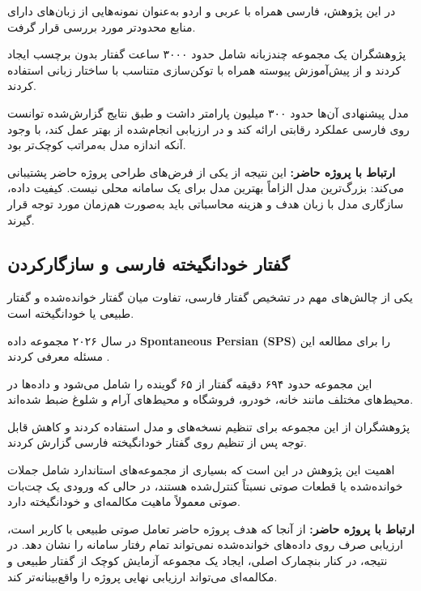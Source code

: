 در این پژوهش، فارسی همراه با عربی و اردو به‌عنوان نمونه‌هایی
از زبان‌های دارای منابع محدودتر مورد بررسی قرار گرفت.

پژوهشگران یک مجموعه چندزبانه شامل حدود ۳۰۰۰ ساعت گفتار
بدون برچسب ایجاد کردند و از پیش‌آموزش پیوسته همراه با
توکن‌سازی متناسب با ساختار زبانی استفاده کردند.

مدل پیشنهادی آن‌ها حدود ۳۰۰ میلیون پارامتر داشت و طبق نتایج
گزارش‌شده توانست روی فارسی عملکرد رقابتی ارائه کند و در
ارزیابی انجام‌شده از
بهتر عمل کند، با وجود آنکه اندازه مدل به‌مراتب کوچک‌تر بود.

\textbf{ارتباط با پروژه حاضر:}
این نتیجه از یکی از فرض‌های طراحی پروژه حاضر پشتیبانی می‌کند:
بزرگ‌ترین مدل الزاماً بهترین مدل برای یک سامانه محلی نیست.
کیفیت داده، سازگاری مدل با زبان هدف و هزینه محاسباتی باید
به‌صورت هم‌زمان مورد توجه قرار گیرند.


\subsection{گفتار خودانگیخته فارسی و سازگارکردن }

یکی از چالش‌های مهم در تشخیص گفتار فارسی، تفاوت میان گفتار
خوانده‌شده و گفتار طبیعی یا خودانگیخته است.

در سال ۲۰۲۶ مجموعه داده
\textbf{Spontaneous Persian  (SPS)}
را برای مطالعه این مسئله معرفی کردند
\cite{namdarzadeh2026sps}.

این مجموعه حدود ۶۹۴ دقیقه گفتار از ۶۵ گوینده را شامل می‌شود
و داده‌ها در محیط‌های مختلف مانند خانه، خودرو، فروشگاه و
محیط‌های آرام و شلوغ ضبط شده‌اند.

پژوهشگران از این مجموعه برای تنظیم نسخه‌های
و
مدل  استفاده کردند و کاهش قابل توجه  پس از
تنظیم روی گفتار خودانگیخته فارسی گزارش کردند.

اهمیت این پژوهش در این است که بسیاری از مجموعه‌های استاندارد
 شامل جملات خوانده‌شده یا قطعات صوتی نسبتاً کنترل‌شده هستند،
در حالی که ورودی یک چت‌بات صوتی معمولاً ماهیت مکالمه‌ای و
خودانگیخته دارد.

\textbf{ارتباط با پروژه حاضر:}
از آنجا که هدف پروژه حاضر تعامل صوتی طبیعی با کاربر است،
ارزیابی صرف روی داده‌های خوانده‌شده نمی‌تواند تمام رفتار
سامانه را نشان دهد.
در نتیجه، در کنار بنچمارک اصلی، ایجاد یک مجموعه آزمایش کوچک
از گفتار طبیعی و مکالمه‌ای می‌تواند ارزیابی نهایی پروژه را
واقع‌بینانه‌تر کند.


